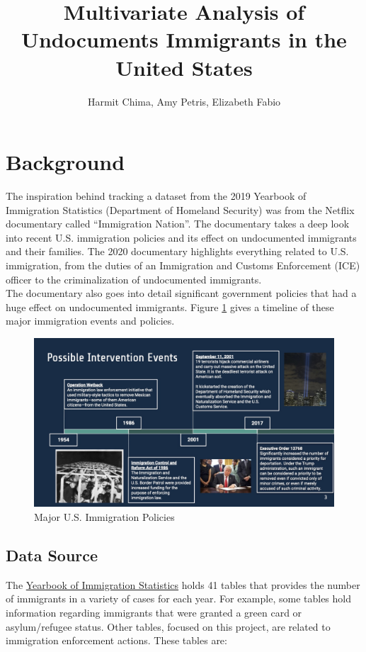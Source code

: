 \documentclass[a4paper]{article}
\title{Multivariate Analysis of Undocuments Immigrants in the United States}
\author{Harmit Chima, Amy Petris, Elizabeth Fabio}
\begin{document}
\maketitle

\section{Background}

The inspiration behind tracking a dataset from the 2019 Yearbook of Immigration Statistics (Department of Homeland Security) was from the Netflix documentary called “Immigration Nation”. The documentary takes a deep look into recent U.S. immigration policies and its effect on undocumented immigrants and their families. The 2020 documentary highlights everything related to U.S. immigration, from the duties of an Immigration and Customs Enforcement (ICE) officer to the criminalization of undocumented immigrants. \\

The documentary also goes into detail significant government policies that had a huge effect on undocumented immigrants. Figure \ref{fig:int_events} gives a timeline of these major immigration events and policies.

\begin{figure}[h!]
\centering
\includegraphics[scale=0.3]{images/int_events.jpg}
\caption{Major U.S. Immigration Policies}
\label{fig:int_events}
\end{figure}

\subsection{Data Source}

The \href{https://www.dhs.gov/immigration-statistics/yearbook/20192019}{Yearbook of Immigration Statistics} holds 41 tables that provides the number of immigrants in a variety of cases for each year. For example, some tables hold information regarding immigrants that were granted a green card or asylum/refugee status. Other tables, focused on this project, are related to immigration enforcement actions. These tables are:
\end{document}
